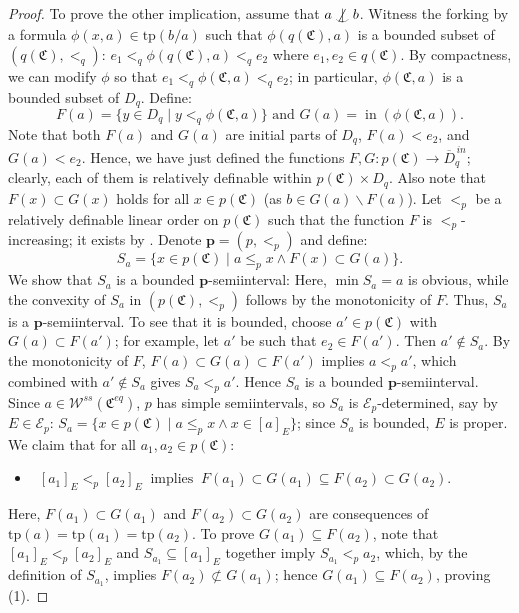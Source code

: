 \documentclass{amsart}
\theoremstyle{definition}
\theoremstyle{definition}
\def\notind#1#2{#1\setbox0=\hbox{$#1x$}\kern\wd0
\hbox to 0pt{\mathchardef\nn=12854\hss$#1\nn$\kern1.4\wd0\hss}
\hbox to 0pt{\hss$#1\mid$\hss}\lower.9\ht0 \hbox to 0pt{\hss$#1\smile$\hss}\kern\wd0}
\def\dep{\mathop{\mathpalette\notind{}}}
\newcommand{\Mon}{\mathfrak C}
\newcommand{\Moneq}{\mathfrak C^{eq}}
\newcommand{\tp}{\mathrm{tp}}
\DeclareMathOperator{\supin}{in}
\begin{document}
\begin{proof}
To prove the other implication, assume that $a\dep b$. 
Witness the forking by a formula $\phi(x,a)\in \tp(b/a)$ such that $\phi(q(\Mon),a)$ is a bounded subset of $(q(\Mon),<_q)$:   $e_1<_q\phi(q(\Mon),a)<_qe_2$ where $e_1,e_2\in q(\Mon)$. By compactness, we can modify $\phi$ so that $e_1<_q\phi(\Mon,a)<_qe_2$; in particular, $\phi(\Mon,a)$ is a bounded subset of $D_q$. Define:
\[F(a)=\{y\in D_q\mid y<_q\phi(\Mon,a)\} \mbox{ \ and  \ } G(a)=\supin(\phi(\Mon,a)) . \]
Note that both $F(a)$ and $G(a)$ are initial parts of $D_q$, $F(a)<e_2$, and $G(a)<e_2$. Hence, we have just defined the functions $F,G:p(\Mon)\to \overline{D}_q^{\,in}$; clearly, each of them is relatively definable within $p(\Mon)\times D_q$. Also note that $F(x)\subset G(x)$ holds for all $x\in p(\Mon)$ (as $b\in G(a)\smallsetminus F(a)$). 
Let $<_p$ be a relatively definable linear order on $p(\Mon)$ such that the function $F$ is $<_p$-increasing; it exists by \cite[Theorem 1(i)]{MTwom}. Denote $\mathbf p=(p,<_p)$ and define:
\[S_a=\{x\in p(\Mon)\mid a\leqslant_p x\land F(x)\subset G(a) \}.\]
We show that $S_a$ is a bounded $\mathbf p$-semiinterval: 
Here, $\min S_a=a$ is obvious, while the convexity of $S_a$ in $(p(\Mon),<_p)$ follows by the monotonicity of $F$. Thus, $S_a$ is a $\mathbf p$-semiinterval. 
To see that it is bounded, choose $a'\in p(\Mon)$ with $G(a)\subset F(a')$; for example, let $a'$ be such that $e_2\in F(a')$.
Then $a'\notin S_a$. By the monotonicity of $F$, $F(a)\subset G(a)\subset F(a')$ implies $a<_pa'$, which combined with $a'\notin S_a$ gives $S_a<_pa'$. Hence $S_a$ is a bounded $\mathbf p$-semiinterval.  
Since $a\in \mathcal W^{ss}(\Moneq)$, $p$ has simple semiintervals, so
$S_a$ is $\mathcal E_p$-determined, say by $E\in\mathcal E_p$: $S_a=\{x\in p(\Mon)\mid a\leqslant_p x\land x\in[a]_{E}\}$; since $S_a$ is bounded, $E$ is proper. We claim that for all $a_1,a_2\in p(\Mon)$: 
\begin{itemize} 
\item[(1)] \  $[a_1]_{E}<_p[a_2]_{E} \ \text{ implies } \ F(a_1)\subset G(a_1)\subseteq F(a_2)\subset G(a_2).$
\end{itemize}
Here, $F(a_1)\subset G(a_1)$ and $F(a_2)\subset G(a_2)$ are consequences of $\tp(a)=\tp(a_1)=\tp(a_2)$. To prove $G(a_1)\subseteq F(a_2)$, note that $[a_1]_{E}<_p [a_2]_{E}$ and $S_{a_1}\subseteq [a_1]_{E}$ together imply $S_{a_1}<_pa_2$, which, by the definition of $S_{a_1}$, implies $F(a_2)\nsubset G(a_1)$; hence  $G(a_1)\subseteq F(a_2)$, proving (1). 


\end{proof}
\end{document}
